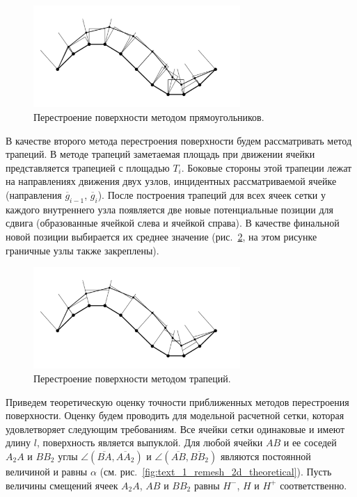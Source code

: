 \begin{figure}[ht]
\centering
\includegraphics[width=0.7\textwidth]{pics/text_1_remesh_2d/grid_rectangles.pdf}
\singlespacing
{}\caption{Перестроение поверхности методом прямоугольников.}
\label{fig:text_1_remesh_2d_grid_rectangles}
\end{figure}

В качестве второго метода перестроения поверхности будем рассматривать метод трапеций\label{term:method_remesh_trap}.
В методе трапеций заметаемая площадь при движении ячейки представляется трапецией с площадью $T_i$.
Боковые стороны этой трапеции лежат на направлениях движения двух узлов, инцидентных рассматриваемой ячейке (направления $\overline{g}_{i - 1}$, $\overline{g}_i$).
После построения трапеций для всех ячеек сетки у каждого внутреннего узла появляется две новые потенциальные позиции для сдвига (образованные ячейкой слева и ячейкой справа).
В качестве финальной новой позиции выбирается их среднее значение (рис.~\ref{fig:text_1_remesh_2d_grid_trapeziums}, на этом рисунке граничные узлы также закреплены).

\begin{figure}[ht]
\centering
\includegraphics[width=0.7\textwidth]{pics/text_1_remesh_2d/grid_trapeziums.pdf}
\singlespacing
{}\caption{Перестроение поверхности методом трапеций.}
\label{fig:text_1_remesh_2d_grid_trapeziums}
\end{figure}

Приведем теоретическую оценку точности приближенных методов перестроения поверхности.
Оценку будем проводить для модельной расчетной сетки, которая удовлетворяет следующим требованиям.
Все ячейки сетки одинаковые и имеют длину $l$, поверхность является выпуклой.
Для любой ячейки $AB$ и ее соседей $A_2A$ и $BB_2$ углы $\angle (\overline{BA}, \overline{AA_2})$ и $\angle (\overline{AB}, \overline{BB_2})$ являются постоянной величиной и равны $\alpha$ (см. рис.~\ref{fig:text_1_remesh_2d_theoretical}).
Пусть величины смещений ячеек $A_2A$, $AB$ и $BB_2$ равны $H^{-}$, $H$ и $H^{+}$ соответственно.

